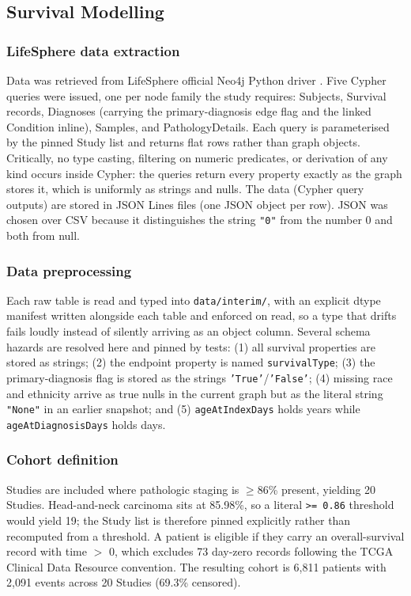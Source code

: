 \subsection{Survival Modelling}

\subsubsection{LifeSphere data extraction}

Data was retrieved from LifeSphere  official Neo4j Python driver \needcite{}. Five Cypher queries were issued, one per node family the study requires: Subjects, Survival records, Diagnoses (carrying the primary-diagnosis edge flag and the linked Condition inline), Samples, and PathologyDetails. Each query is parameterised by the pinned Study list and returns flat rows rather than graph objects. Critically, no type casting, filtering on numeric predicates, or derivation of any kind occurs inside Cypher: the queries return every property exactly as the graph stores it, which is uniformly as strings and nulls. The data (Cypher query outputs) are stored in JSON Lines files (one JSON object per row). JSON was chosen over CSV because it distinguishes the string \texttt{"0"} from the number 0 and both from null.

\subsubsection{Data preprocessing}

Each raw table is read and typed into \texttt{data/interim/}, with an explicit dtype manifest written alongside each table and enforced on read, so a type that drifts fails loudly instead of silently arriving as an object column. Several schema hazards are resolved here and pinned by tests: (1) all survival properties are stored as strings; (2) the endpoint property is named \texttt{survivalType}; (3) the primary-diagnosis flag is stored as the strings \texttt{'True'}/\texttt{'False'}; (4) missing race and ethnicity arrive as true nulls in the current graph but as the literal string \texttt{"None"} in an earlier snapshot; and (5) \texttt{ageAtIndexDays} holds years while \texttt{ageAtDiagnosisDays} holds days.

\subsubsection{Cohort definition}

Studies are included where pathologic staging is $\geq$86\% present, yielding 20 Studies. Head-and-neck carcinoma sits at 85.98\%, so a literal \texttt{>= 0.86} threshold would yield 19; the Study list is therefore pinned explicitly rather than recomputed from a threshold. A patient is eligible if they carry an overall-survival record with time $>$ 0, which excludes 73 day-zero records following the TCGA Clinical Data Resource convention. The resulting cohort is 6,811 patients with 2,091 events across 20 Studies (69.3\% censored).

